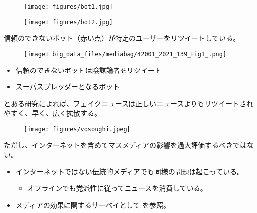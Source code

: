 \documentclass[
  xelatex,
  ja=standard]{bxjsarticle}
\providecommand{\tightlist}{%
  \setlength{\itemsep}{0pt}\setlength{\parskip}{0pt}}\usepackage{longtable,booktabs,array}
\begin{document}
\begin{figure}[htpb]

{\centering \texttt{[image: figures/bot1.jpg]}

}

\caption{\citet{gorodnichenko2021}}

\end{figure}

\begin{figure}[htpb]

{\centering \texttt{[image: figures/bot2.jpg]}

}

\caption{\citet{gorodnichenko2021}}

\end{figure}

信頼のできないボット（赤い点）が特定のユーザーをリツイートしている。

\begin{figure}[htpb]

{\centering \texttt{[image: big\_data\_files/mediabag/42001\_2021\_139\_Fig1\_.png]}

}

\caption{\citet{xu2022}}

\end{figure}

\begin{itemize}
\tightlist
\item
  信頼のできないボットは陰謀論者をリツイート
\item
  スーパスプレッダーとなるボット
\end{itemize}

\href{https://www.natureasia.com/ja-jp/ndigest/v15/n5/\%E3\%83\%95\%E3\%82\%A7\%E3\%82\%A4\%E3\%82\%AF\%E3\%83\%8B\%E3\%83\%A5\%E3\%83\%BC\%E3\%82\%B9\%E3\%81\%AF\%E9\%80\%9F\%E3\%81\%8F\%E5\%BA\%83\%E3\%81\%8F\%E4\%BC\%9D\%E3\%82\%8F\%E3\%82\%8B/92004}{とある研究}によれば、フェイクニュースは正しいニュースよりもリツイートされやすく、早く、広く拡散する。

\begin{figure}[htpb]

{\centering \texttt{[image: figures/vosoughi.jpeg]}

}

\caption{\citet{vosoughi2018}}

\end{figure}

ただし、インターネットを含めてマスメディアの影響を過大評価するべきではない。

\begin{itemize}
\tightlist
\item
  インターネットではない伝統的メディアでも同様の問題は起こっている。

  \begin{itemize}
  \tightlist
  \item
    オフラインでも党派性に従ってニュースを消費している\citep{gentzkow2011, martin2017}。
  \end{itemize}
\item
  メディアの効果に関するサーベイとして \citet{inamasu2022} を参照。
\end{itemize}
\end{document}
